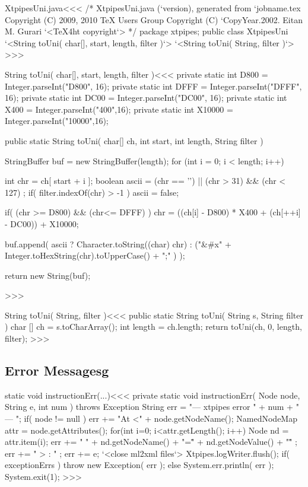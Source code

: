 \documentclass{article}
\begin{document}


\<XtpipesUni.java\><<<
/* XtpipesUni.java (`version), generated from `jobname.tex
   Copyright (C) 2009, 2010 TeX Users Group
   Copyright (C) `CopyYear.2002. Eitan M. Gurari
`<TeX4ht copyright`> */
package xtpipes;
public class XtpipesUni{
   `<String toUni( char[], start, length, filter )`>
   `<String toUni( String, filter )`>
}
>>>

\<String toUni( char[], start, length, filter )\><<<
private static int D800 = Integer.parseInt("D800", 16);
private static int DFFF = Integer.parseInt("DFFF", 16);
private static int DC00 = Integer.parseInt("DC00", 16);
private static int X400 = Integer.parseInt("400",16);
private static int X10000 = Integer.parseInt("10000",16);


public static String toUni( char[] ch, int start, int length,
                                           String filter ){
   StringBuffer buf = new StringBuffer(length);
   for (int i = 0; i < length; i++) {
       int chr = ch[ start + i ];
       boolean ascii =  (chr == '\n')
                        || (chr > 31) && (chr < 127) ;
       if( filter.indexOf(chr) > -1 ){ ascii = false; }

       if( (chr >= D800) && (chr<= DFFF) ){
          chr = ((ch[i] - D800) * X400 + (ch[++i] - DC00)) + X10000;
       }


       buf.append(
         ascii ? Character.toString((char) chr)
               : ("&#x"
                 + Integer.toHexString(chr).toUpperCase()
                 + ";" ) );
   }
   return new String(buf);
}
>>>

\<String toUni( String, filter )\><<<
public static String toUni( String s, String filter ){
   char [] ch = s.toCharArray();
   int length = ch.length;
   return toUni(ch, 0, length, filter);
}
>>>







\subsection{Error Messagesg}






\<static void instructionErr(...)\><<<
private static void instructionErr( Node node, String e, int num )
                                     throws Exception {
   String err = "--- xtpipes error " + num + " --- ";
   if( node != null ){
      err += "At <" + node.getNodeName();
      NamedNodeMap attr = node.getAttributes();
      for(int i=0; i<attr.getLength(); i++){
         Node nd = attr.item(i);
         err += " " +
             nd.getNodeName()  + "=\"" +
             nd.getNodeValue() + "\"" ;
      }
      err += " > : " ;
   }
   err += e;
   `<close ml2xml files`>
   Xtpipes.logWriter.flush();
   if( exceptionErrs ) { throw new Exception( err );  }
   else {
      System.err.println( err );
      System.exit(1);
   }
}
>>>
\end{document}
